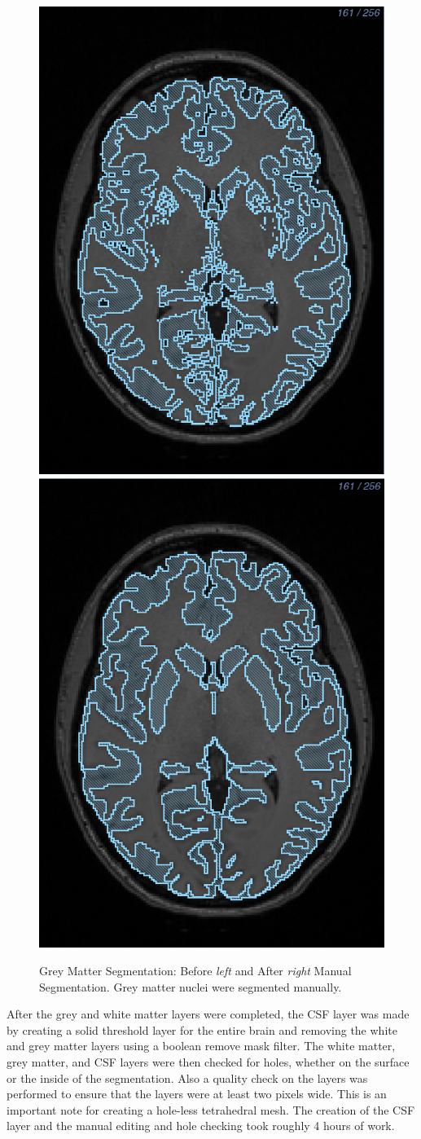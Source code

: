 \begin{figure}[H]
\begin{center}
\includegraphics[width=.49\textwidth]{Figures/greymatter_before_nuclei}
\includegraphics[width=.49\textwidth]{Figures/greymatter_added_nuclei}
\caption{Grey Matter Segmentation: Before \textit{left} and After \textit{right} Manual Segmentation. Grey matter nuclei were segmented manually.}
\label{fig:gm}
\end{center}
\end{figure}

After the grey and white matter layers were completed, the CSF layer was made by creating a solid threshold layer for the entire brain and removing the white and grey matter layers using a boolean remove mask filter. The white matter, grey matter, and CSF layers were then checked for holes, whether on the surface or the inside of the segmentation. Also a quality check on the layers was performed to ensure that the layers were at least two pixels wide. This is an important note for creating a hole-less tetrahedral mesh. The creation of the CSF layer and the manual editing and hole checking took roughly 4 hours of work.

